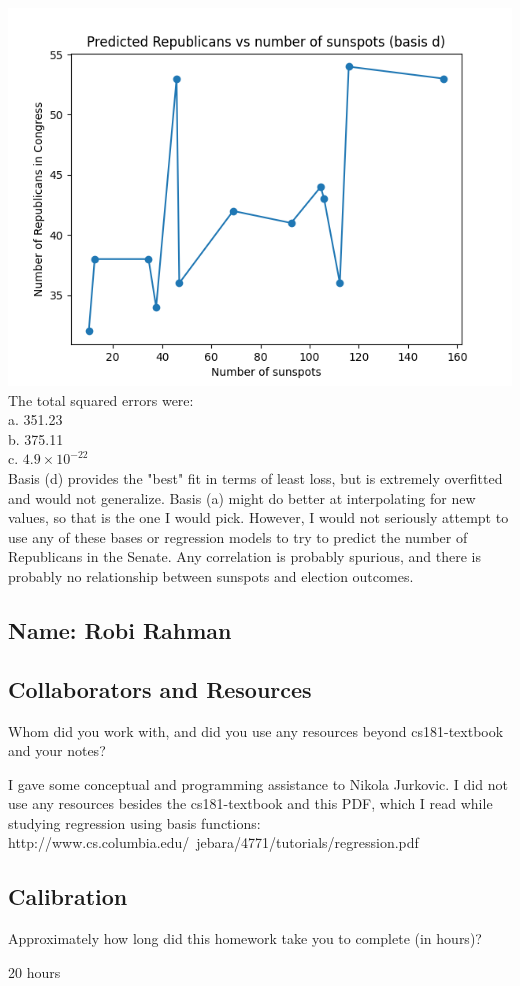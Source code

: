 \documentclass[submit]{harvardml}
\begin{document}
\begin{enumerate}
    \includegraphics{42d.png}
    The total squared errors were:\\
    a. 351.23\\
    b. 375.11\\
    c. $4.9 \times 10^{-22}$\\
    Basis (d) provides the "best" fit in terms of least loss, but is extremely overfitted and would not generalize. Basis (a) might do better at interpolating for new values, so that is the one I would pick.
    However, I would not seriously attempt to use any of these bases or regression models to try to predict the number of Republicans in the Senate. Any correlation is probably spurious, and there is probably no relationship between sunspots and election outcomes.
\end{enumerate}



\newpage
\subsection*{Name: Robi Rahman}

\subsection*{Collaborators and Resources}
Whom did you work with, and did you use any resources beyond cs181-textbook and your notes?

I gave some conceptual and programming assistance to Nikola Jurkovic. I did not use any resources besides the cs181-textbook and this PDF, which I read while studying regression using basis functions: http://www.cs.columbia.edu/~jebara/4771/tutorials/regression.pdf

\subsection*{Calibration}
Approximately how long did this homework take you to complete (in hours)?

20 hours
\end{document}
